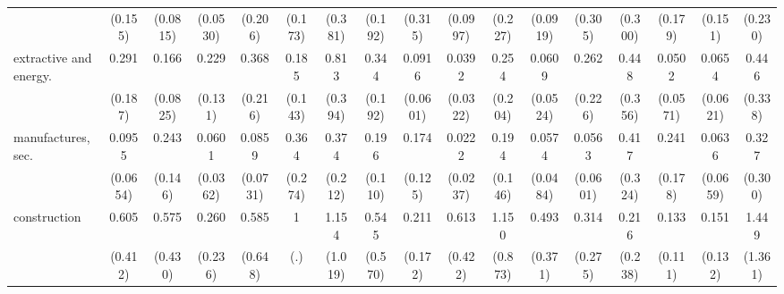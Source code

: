 {\begin{tabular}{l*{16}{c}}
                    &     (0.155)         &    (0.0815)         &    (0.0530)         &     (0.206)         &     (0.173)         &     (0.381)         &     (0.192)         &     (0.315)         &    (0.0997)         &     (0.227)         &    (0.0919)         &     (0.305)         &     (0.300)         &     (0.179)         &     (0.151)         &     (0.230)         \\
[1em]
extractive and energy.&       0.291         &       0.166\sym{***}&       0.229\sym{**} &       0.368         &       0.185\sym{*}  &       0.813         &       0.344         &      0.0916\sym{***}&      0.0392\sym{***}&       0.254         &      0.0609\sym{**} &       0.262         &       0.448         &      0.0502\sym{**} &      0.0654\sym{**} &       0.446         \\
                    &     (0.187)         &    (0.0825)         &     (0.131)         &     (0.216)         &     (0.143)         &     (0.394)         &     (0.192)         &    (0.0601)         &    (0.0322)         &     (0.204)         &    (0.0524)         &     (0.226)         &     (0.356)         &    (0.0571)         &    (0.0621)         &     (0.338)         \\
[1em]
manufactures, sec.  &      0.0955\sym{***}&       0.243\sym{*}  &      0.0601\sym{***}&      0.0859\sym{**} &       0.364         &       0.374         &       0.196\sym{**} &       0.174\sym{*}  &      0.0222\sym{***}&       0.194\sym{*}  &      0.0574\sym{***}&      0.0563\sym{**} &       0.417         &       0.241         &      0.0636\sym{**} &       0.327         \\
                    &    (0.0654)         &     (0.146)         &    (0.0362)         &    (0.0731)         &     (0.274)         &     (0.212)         &     (0.110)         &     (0.125)         &    (0.0237)         &     (0.146)         &    (0.0484)         &    (0.0601)         &     (0.324)         &     (0.178)         &    (0.0659)         &     (0.300)         \\
[1em]
construction        &       0.605         &       0.575         &       0.260         &       0.585         &           1         &       1.154         &       0.545         &       0.211         &       0.613         &       1.150         &       0.493         &       0.314         &       0.216         &       0.133\sym{*}  &       0.151\sym{*}  &       1.449         \\
                    &     (0.412)         &     (0.430)         &     (0.236)         &     (0.648)         &         (.)         &     (1.019)         &     (0.570)         &     (0.172)         &     (0.422)         &     (0.873)         &     (0.371)         &     (0.275)         &     (0.238)         &     (0.111)         &     (0.132)         &     (1.361)         \\

\end{tabular}}
